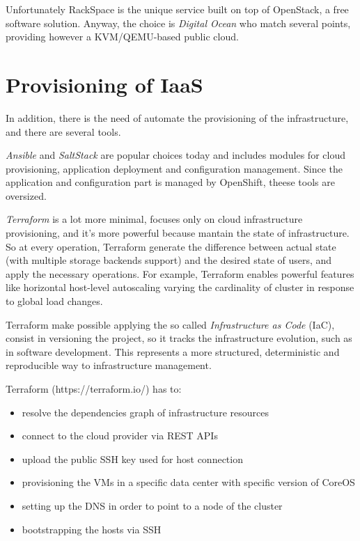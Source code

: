 Unfortunately RackSpace is the unique service built on top of OpenStack,
a free software solution. Anyway, the choice is \emph{Digital Ocean} who
match several points, providing however a KVM/QEMU-based public cloud.

\section{Provisioning of IaaS}\label{provisioning-of-iaas}

In addition, there is the need of automate the provisioning of the
infrastructure, and there are several tools.

\emph{Ansible} and \emph{SaltStack} are popular choices today and
includes modules for cloud provisioning, application deployment and
configuration management. Since the application and configuration part
is managed by OpenShift, theese tools are oversized.

\emph{Terraform} is a lot more minimal, focuses only on cloud
infrastructure provisioning, and it's more powerful because mantain the
state of infrastructure. So at every operation, Terraform generate the
difference between actual state (with multiple storage backends support)
and the desired state of users, and apply the necessary operations. For
example, Terraform enables powerful features like horizontal host-level
autoscaling varying the cardinality of cluster in response to global
load changes.

Terraform make possible applying the so called \emph{Infrastructure as
Code} (IaC), consist in versioning the project, so it tracks the
infrastructure evolution, such as in software development. This
represents a more structured, deterministic and reproducible way to
infrastructure management.

Terraform (https://terraform.io/) has to:

\begin{itemize}
\itemsep1pt\parskip0pt
\item
  resolve the dependencies graph of infrastructure resources
\item
  connect to the cloud provider via REST APIs
\item
  upload the public SSH key used for host connection
\item
  provisioning the VMs in a specific data center with specific version
  of CoreOS
\item
  setting up the DNS in order to point to a node of the cluster
\item
  bootstrapping the hosts via SSH
\end{itemize}

